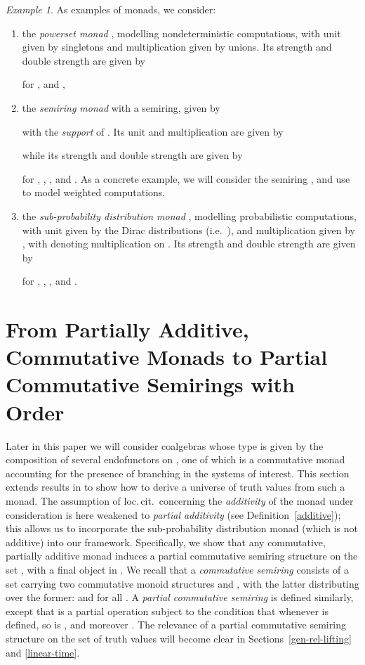 \documentclass[submission,copyright,creativecommons]{eptcs}
\theoremstyle{plain}\newtheorem{theorem}{Theorem}[section]
\theoremstyle{remark}
\newtheorem{example}[remark]{Example}
\begin{document}
\begin{example}
\label{example-monads}
As examples of monads, we consider:
\begin{enumerate}
\item the \emph{powerset monad} , modelling nondeterministic computations, with unit given by singletons and multiplication given by unions. Its strength and double strength are given by 

for ,  and ,
\item the \emph{semiring monad}  with  a semiring, given by

with  the \emph{support} of . Its unit and multiplication are given by

while its strength and double strength are given by

for , , ,  and .
As a concrete example, we will consider the semiring , and use  to model weighted computations.
\item the \emph{sub-probability distribution monad} , modelling probabilistic computations, with unit given by the Dirac distributions (i.e.~), and multiplication given by , with  denoting multiplication on . Its strength and double strength are given by

for , , ,  and .
\end{enumerate}
\end{example}

\section{From Partially Additive, Commutative Monads to Partial Commutative Semirings with Order}
\label{semiring}

Later in this paper we will consider coalgebras whose type is given by the composition of several endofunctors on , one of which is a commutative monad  accounting for the presence of branching in the systems of interest. This section extends results in \cite{Kock2011,CoumansJ2011} to show how to derive a universe of truth values from such a monad. The assumption of loc.\,cit.~concerning the \emph{additivity} of the monad under consideration is here weakened to \emph{partial additivity} (see Definition~\ref{additive}); this allows us to incorporate the sub-probability distribution monad (which is not additive) into our framework. Specifically, we show that any commutative, partially additive monad  induces a partial commutative semiring structure on the set , with  a final object in . We recall that a \emph{commutative semiring} consists of a set  carrying two commutative monoid structures  and , with the latter distributing over the former:  and  for all . A \emph{partial commutative semiring} is defined similarly, except that  is a partial operation subject to the condition that whenever  is defined, so is , and moreover . The relevance of a partial commutative semiring structure on the set of truth values will become clear in Sections~\ref{gen-rel-lifting} and \ref{linear-time}.
\end{document}
